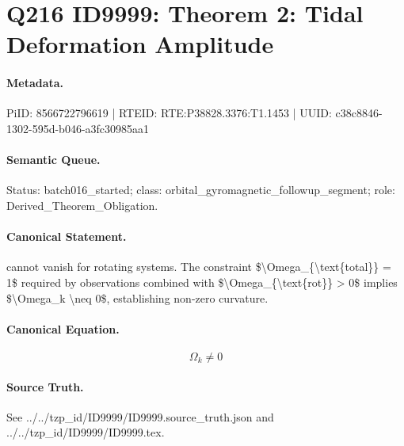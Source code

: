 \section*{Q216 ID9999: Theorem 2: Tidal Deformation Amplitude}
\paragraph{Metadata.}
PiID: 8566722796619 | RTEID: RTE:P38828.3376:T1.1453 | UUID: c38c8846-1302-595d-b046-a3fc30985aa1

\paragraph{Semantic Queue.}
Status: batch016\_started; class: orbital\_gyromagnetic\_followup\_segment; role: Derived\_Theorem\_Obligation.

\paragraph{Canonical Statement.}
cannot vanish for rotating systems. The constraint \$\textbackslash{}Omega\_\{\textbackslash{}text\{total\}\} = 1\$ required by observations combined with \$\textbackslash{}Omega\_\{\textbackslash{}text\{rot\}\} > 0\$ implies \$\textbackslash{}Omega\_k \textbackslash{}neq 0\$, establishing non-zero curvature.

\paragraph{Canonical Equation.}
\[
\Omega_k \neq 0
\]

\paragraph{Source Truth.}
See ../../tzp\_id/ID9999/ID9999.source\_truth.json and ../../tzp\_id/ID9999/ID9999.tex.
